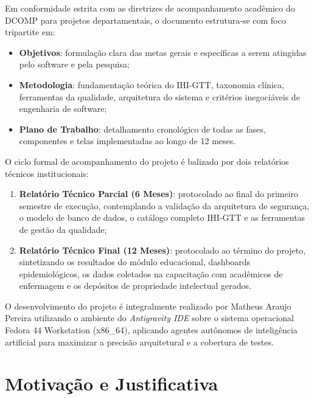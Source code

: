 Em conformidade estrita com as diretrizes de acompanhamento acadêmico do DCOMP para projetos departamentais, o documento estrutura-se com foco tripartite em:
\begin{itemize}
    \item \textbf{Objetivos}: formulação clara das metas gerais e específicas a serem atingidas pelo software e pela pesquisa;
    \item \textbf{Metodologia}: fundamentação teórica do IHI-GTT, taxonomia clínica, ferramentas da qualidade, arquitetura do sistema e critérios inegociáveis de engenharia de software;
    \item \textbf{Plano de Trabalho}: detalhamento cronológico de todas as fases, componentes e telas implementadas ao longo de 12 meses.
\end{itemize}

O ciclo formal de acompanhamento do projeto é balizado por dois relatórios técnicos institucionais:
\begin{enumerate}
    \item \textbf{Relatório Técnico Parcial (6 Meses)}: protocolado ao final do primeiro semestre de execução, contemplando a validação da arquitetura de segurança, o modelo de banco de dados, o catálogo completo IHI-GTT e as ferramentas de gestão da qualidade;
    \item \textbf{Relatório Técnico Final (12 Meses)}: protocolado ao término do projeto, sintetizando os resultados do módulo educacional, dashboards epidemiológicos, os dados coletados na capacitação com acadêmicos de enfermagem e os depósitos de propriedade intelectual gerados.
\end{enumerate}

O desenvolvimento do projeto é integralmente realizado por Matheus Araujo Pereira utilizando o ambiente do \textit{Antigravity IDE} sobre o sistema operacional Fedora 44 Workstation (x86\_64), aplicando agentes autônomos de inteligência artificial para maximizar a precisão arquitetural e a cobertura de testes.

\section{Motivação e Justificativa}
\label{sec:motivacao}

